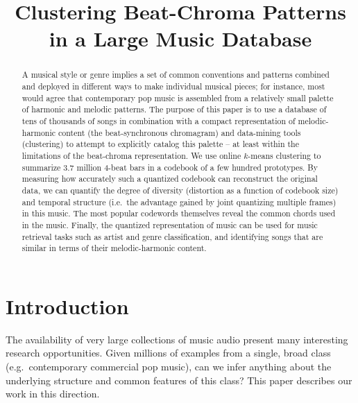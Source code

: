 \documentclass{article}
\title{Clustering Beat-Chroma Patterns\\ in a Large Music Database}
\newcommand{\ie}{i.e.~}
\newcommand{\eg}{e.g.~}
\begin{document}
%
\maketitle
%
\begin{abstract}
A musical style or genre implies a set of common conventions
and patterns combined and deployed in different ways to make
individual musical pieces; for instance, most would agree that
contemporary pop music is assembled from a relatively small
palette of harmonic and melodic patterns.  The purpose of this
paper is to use a database of tens of thousands of songs
in combination with a compact representation of melodic-harmonic
content (the beat-synchronous chromagram) and data-mining
tools (clustering) to attempt to explicitly catalog this palette --
at least within the limitations of the beat-chroma representation.
We use online $k$-means clustering to summarize 3.7 million
4-beat bars in a codebook of a few hundred prototypes.
By measuring how accurately such a quantized codebook
can reconstruct the original data, we can quantify the degree
of diversity (distortion as a function of codebook size) and
temporal structure (\ie the advantage gained
by joint quantizing multiple frames) in this music.  The most
popular codewords themselves reveal the common chords
used in the music.  Finally, the quantized representation of
music can be used for music retrieval tasks such as artist
and genre classification, and identifying songs that are
similar in terms of their melodic-harmonic content.
\end{abstract}
%
\section{Introduction}\label{sec:introduction}
The availability of very large collections of music audio present
many interesting research opportunities.  Given millions of examples
from a single, broad class (\eg contemporary commercial pop music),
can we infer anything about the underlying structure and common
features of this class?  This paper describes our work in this direction.
\end{document}
